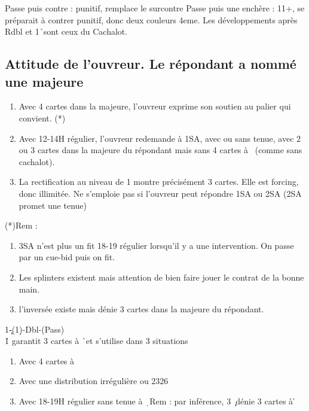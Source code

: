 \documentclass[a4paper]{article}
\begin{document}
Passe puis contre : punitif, remplace le surcontre
Passe puis une enchère : 11+, se préparait à contrer punitif, donc deux couleurs 4eme.
Les développements après Rdbl et 1\h\ sont ceux du Cachalot.

\subsection{Attitude de l’ouvreur. Le répondant a 
nommé une majeure}

\begin{enumerate}
\item Avec 4 cartes dans la majeure, l’ouvreur exprime son soutien 
au palier qui convient. (*)

\item Avec 12-14H régulier, l’ouvreur redemande à 1SA, avec ou 
sans tenue, avec 2 ou 3 cartes dans la majeure du répondant 
mais sans 4 cartes à \s\ (comme sans cachalot).

\item La rectification au niveau de 1 montre précisément 3 cartes. 
Elle est forcing, donc illimitée. Ne s’emploie pas si l’ouvreur 
peut répondre 1SA ou 2SA (2SA promet une tenue)

\end{enumerate}

(*)Rem :

\begin{enumerate}
\item 3SA n’est plus un fit 18-19 régulier lorsqu’il y a une intervention. On passe
par un cue-bid puis on fit.

\item Les splinters existent mais attention de bien faire jouer le contrat de la 
bonne main.

\item l’inversée existe mais dénie 3 cartes dans la majeure du répondant.

\end{enumerate}

\begin{bidtable}
1\c-(1\d)-Dbl-(Pass)\\
1\h \> garantit 3 cartes à \h\ et s’utilise dans 3 situations
\end{bidtable}

\begin{enumerate}
\item Avec 4 cartes à \s\ 

\item Avec une distribution irrégulière ou 2326

\item Avec 18-19H régulier sans tenue à \d\ 
Rem : par inférence, 3 \c\ dénie 3 cartes à \h 

\end{enumerate}
\end{document}
